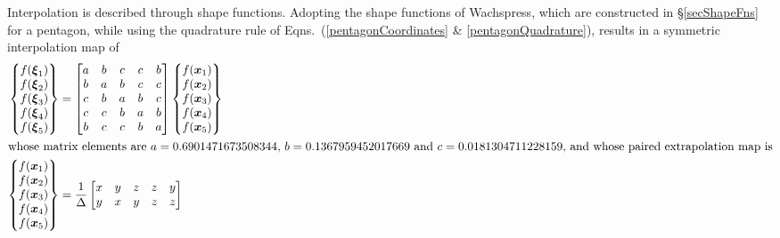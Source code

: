 Interpolation is described through shape functions.  Adopting the shape functions of Wachspress, which are constructed in \S\ref{secShapeFns} for a pentagon, while using the quadrature rule of Eqns.~(\ref{pentagonCoordinates} \& \ref{pentagonQuadrature}), results in a symmetric interpolation map of
\begin{subequations}
    \label{extrapolationPentagon}
    \begin{align} 
    \left\{ \begin{matrix}
    f ( \boldsymbol{\xi}_1 ) \\ 
    f ( \boldsymbol{\xi}_2 ) \\ 
    f ( \boldsymbol{\xi}_3 ) \\ 
    f ( \boldsymbol{\xi}_4 ) \\ 
    f ( \boldsymbol{\xi}_5 )
    \end{matrix} \right\} & = \begin{bmatrix}
    a & b & c & c & b \\
    b & a & b & c & c \\
    c & b & a & b & c \\
    c & c & b & a & b \\
    b & c & c & b & a
    \end{bmatrix} 
    \left\{ \begin{matrix} 
    f ( \boldsymbol{x}_1 ) \\ 
    f ( \boldsymbol{x}_2 ) \\ 
    f ( \boldsymbol{x}_3 ) \\
    f ( \boldsymbol{x}_4 ) \\
    f ( \boldsymbol{x}_5 )
    \end{matrix} \right\} \\
    \intertext{whose matrix elements are $a = 0.6901471673508344$, $b = 0.1367959452017669$ and $c = 0.0181304711228159$, and whose paired extrapolation map is}
    \left\{ \begin{matrix} 
    f ( \boldsymbol{x}_1 ) \\ 
    f ( \boldsymbol{x}_2 ) \\ 
    f ( \boldsymbol{x}_3 ) \\
    f ( \boldsymbol{x}_4 ) \\
    f ( \boldsymbol{x}_5 )
    \end{matrix} \right\} & = \frac{1}{\Delta} \begin{bmatrix}
    x & y & z & z & y \\
    y & x & y & z & z \\

\end{bmatrix}
\end{align}
\end{subequations}
